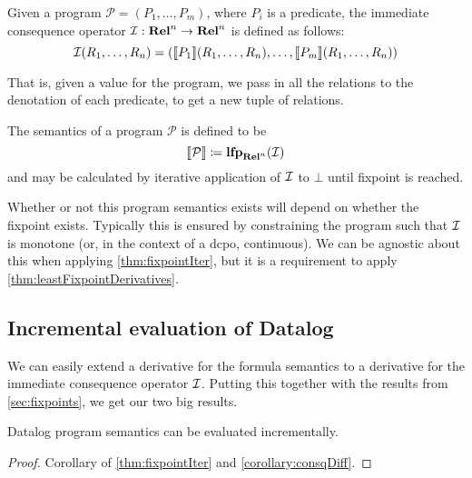 \begin{defn}
  Given a program $\mathcal{P} = (P_1, \dots, P_m)$, where $P_i$ is a predicate,
  the immediate consequence operator $\mathcal{I}: \mathbf{Rel}^n \rightarrow \mathbf{Rel}^n$ is defined as follows:
  \begin{displaymath}
    \mathcal{I}(R_1, \dots, R_n) = (\llbracket P_1 \rrbracket(R_1, \dots, R_n), \dots, \llbracket P_m \rrbracket(R_1, \dots, R_n))
  \end{displaymath}
\end{defn}

That is, given a value for the program, we pass in all the relations
to the denotation of each predicate, to get a new tuple of relations.

\begin{defn}
  The semantics of a program $\mathcal{P}$ is defined to be
  \begin{displaymath}
    \llbracket \mathcal{P} \rrbracket \coloneqq \mathbf{lfp}_{\mathbf{Rel}^n}(\mathcal{I})
  \end{displaymath}
  and may be calculated by iterative application of $\mathcal{I}$ to $\bot$ until
  fixpoint is reached.
\end{defn}

Whether or not this program semantics exists will depend on whether the fixpoint
exists. Typically this is ensured by constraining the program such that $\mathcal{I}$
is monotone (or, in the context of a dcpo, continuous). We can be agnostic
about this when applying \cref{thm:fixpointIter}, but it is a requirement to
apply \cref{thm:leastFixpointDerivatives}.

\subsection{Incremental evaluation of Datalog}
\label{sec:datalogIncr}

We can easily extend a derivative for the formula semantics to a derivative for
the immediate consequence operator $\mathcal{I}$. Putting this together with the
results from \cref{sec:fixpoints}, we get our two big results.

\begin{thm}
\label{thm:diffEval}
  Datalog program semantics can be evaluated incrementally.
\end{thm}
\ifproofs
\begin{proof}
  Corollary of \cref{thm:fixpointIter} and \cref{corollary:consqDiff}.
\end{proof}
\fi

